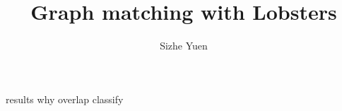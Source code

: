 \documentclass{article}
\title{Graph matching with Lobsters}
\author{Sizhe Yuen}
\begin{document}


\tableofcontents












results why overlap classify \cite{detection-overlap}







\printbibliography


\end{document}

